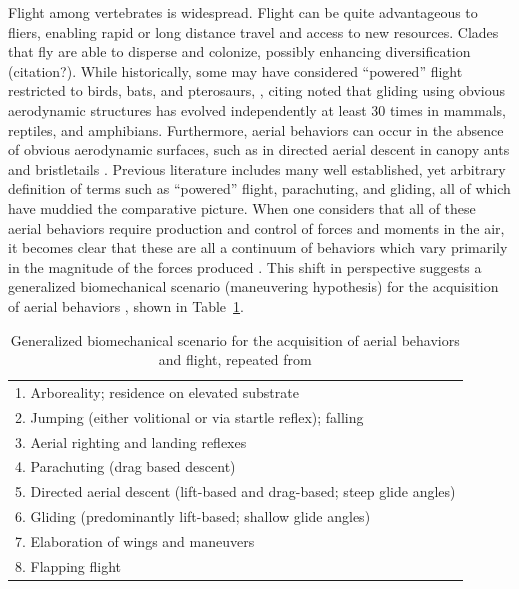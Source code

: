 Flight among vertebrates is widespread.  Flight can be quite advantageous to fliers, enabling rapid or long distance travel and access to new resources.  Clades that fly are able to disperse and colonize, possibly enhancing diversification (citation?).  While historically, some may have considered ``powered'' flight restricted to birds, bats, and pterosaurs, \citet{Dudley:2011}, citing \citep{Rayner:1988, Norberg:1990} noted that gliding using obvious aerodynamic structures has evolved independently at least 30 times in mammals, reptiles, and amphibians.  Furthermore, aerial behaviors can occur in the absence of obvious aerodynamic surfaces, such as in directed aerial descent in canopy ants \citep{Yanoviak:2005, Yanoviak:2011} and bristletails \citep{Yanoviak:2008}.  Previous literature includes many well established, yet arbitrary definition of terms such as ``powered'' flight, parachuting, and gliding, all of which have muddied the comparative picture.  When one considers that all of these aerial behaviors require production and control of forces and moments in the air, it becomes clear that these are all a continuum of behaviors which vary primarily in the magnitude of the forces produced \citep{Dudley:2011}.  This shift in perspective suggests a generalized biomechanical scenario (maneuvering hypothesis) for the acquisition of aerial behaviors \citep{Dudley:2011}, shown in Table~\ref{tbl:scenario}.   
\begin{table}
\caption{Generalized biomechanical scenario for the acquisition of aerial behaviors and flight, repeated from \citep{Dudley:2011}}
\label{tbl:scenario}
\begin{center}
\begin{tabular}{l}
1. Arboreality; residence on elevated substrate \\
2. Jumping (either volitional or via startle reflex); falling \\
3. Aerial righting and landing reflexes \\
4. Parachuting (drag based descent) \\ 
5. Directed aerial descent (lift-based and drag-based; steep glide angles) \\ 
6. Gliding (predominantly lift-based; shallow glide angles) \\ 
7. Elaboration of wings and maneuvers \\
8. Flapping flight \\ 
\end{tabular}
\end{center}
\end{table}

